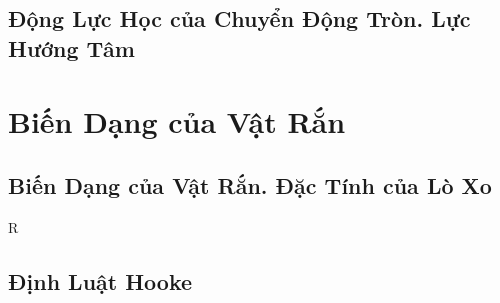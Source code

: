 \documentclass[oneside]{book}
\numberwithin{equation}{section}
\begin{document}
\section{Động Lực Học của Chuyển Động Tròn. Lực Hướng Tâm}


\chapter{Biến Dạng của Vật Rắn}

\section{Biến Dạng của Vật Rắn. Đặc Tính của Lò Xo}

R
\section{Định Luật Hooke}


\printbibliography[heading=bibintoc]
	
\end{document}
